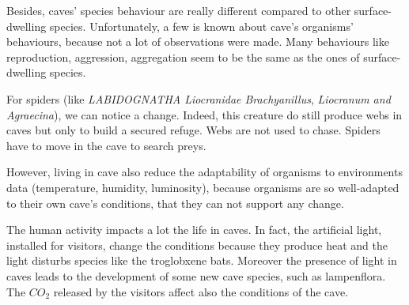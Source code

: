 \documentclass[draft, final]{report}
\begin{document}
Besides, caves’ species behaviour are really different compared to other surface-dwelling species. Unfortunately, a few is known about cave’s organisms’ behaviours, because not a lot of observations were made. Many behaviours like reproduction, aggression, aggregation seem to be the same as the ones of surface-dwelling species.
\par
For spiders (like  \emph{LABIDOGNATHA Liocranidae Brachyanillus}, \emph{Liocranum and Agraecina}), we can notice a change. Indeed, this creature do still produce webs in caves but only to build a secured refuge. Webs are not used to chase. Spiders have to move in the cave to search preys.
\par
However, living in cave also reduce the adaptability of organisms to environments data (temperature, humidity, luminosity), because organisms are so well-adapted to their own cave’s conditions, that they can not support any change.

The human activity impacts a lot the life in caves. In fact, the artificial light, installed for visitors, change the conditions because they produce heat and the light disturbs species like the troglobxene bats. Moreover the presence of light in caves leads to the development of some new cave species, such as lampenflora. The $CO_{2}$ released by the visitors affect also the conditions of the cave.

\clearpage
\end{document}
